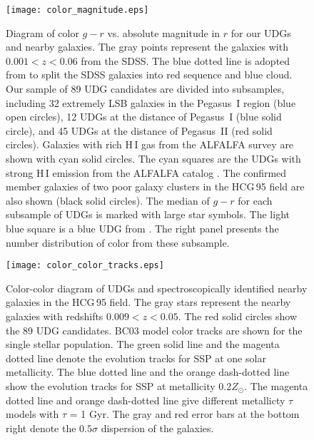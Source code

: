\documentclass[twocolumn,trackchanges]{aastex61}
\begin{document}
\begin{figure}
\setlength{\abovecaptionskip}{-2pt}
\begin{center}
\texttt{[image: color\_magnitude.eps]}
\caption{Diagram of color $g-r$ vs. absolute magnitude in $r$ for our UDGs and nearby galaxies. The gray points represent the galaxies with $0.001<z<0.06$ from the SDSS. The blue dotted line is adopted from \cite{Blanton2006}  to split the SDSS galaxies into red sequence and blue cloud.  Our sample of 89 UDG candidates are divided into subsamples, including 32 extremely LSB galaxies in the Pegasus~I region (blue open circles), 12 UDGs at the distance of Pegasus~I (blue solid circle), and 45 UDGs at the distance of Pegasus~II (red solid circles).  Galaxies with rich H\,{\small I} gas from the ALFALFA survey are shown with cyan solid circles. The cyan squares are the UDGs with strong H\,{\small I} emission from the ALFALFA catalog \citep{Leisman2017}.  The confirmed member galaxies  of two poor galaxy clusters in the HCG\,95 field are also shown (black solid circles). The median of $g-r$ for each subsample of UDGs is marked with large star symbols. The light blue square is a blue UDG from \cite{Trujillo2017}. The right panel presents the number distribution of color from  these subsample.}
\label{fig:fig8}
\end{center}
\end{figure}


\begin{figure}
 \setlength{\abovecaptionskip}{5pt}
 \centering
 \texttt{[image: color\_color\_tracks.eps]}
\caption{Color-color diagram of UDGs and spectroscopically identified nearby galaxies in the HCG\,95 field. The gray stars represent the nearby galaxies with redshifts $0.009<z<0.05$. The red solid circles show the 89 UDG candidates. BC03 model color tracks are shown for the single stellar population. The green solid line and the magenta dotted line denote the evolution tracks for SSP at one solar metallicity. The blue dotted line and the orange dash-dotted line show the evolution tracks for SSP at metallicity 0.2$Z_{\odot}$. The magenta dotted line and orange dash-dotted line give different metallicty $\tau$ models with $\tau$ = 1 Gyr. The gray and red error bars at the bottom right denote the $0.5\sigma$ dispersion of the galaxies.}
\label{fig:fig9}
\end{figure}
\end{document}
